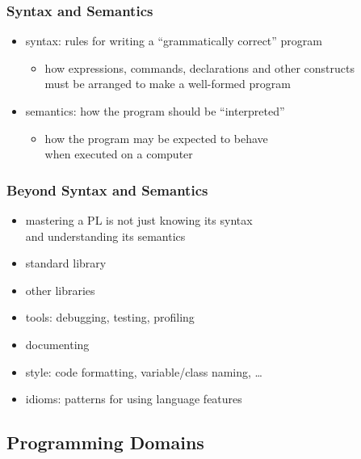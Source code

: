 \documentclass[dvipsnames]{beamer}
\theoremstyle{plain}
\begin{document}
\begin{frame}
  \frametitle{Syntax and Semantics}

  \begin{itemize}
    \item \alert{syntax}: rules for writing a ``grammatically correct'' program
    \begin{itemize}
      \item how expressions, commands, declarations and other constructs\\
        must be arranged to make a well-formed program
    \end{itemize}

    \pause
    \bigskip
    \item \alert{semantics}: how the program should be ``interpreted''
    \begin{itemize}
      \item how the program may be expected to behave\\
        when executed on a computer
    \end{itemize}
  \end{itemize}
\end{frame}

\begin{frame}
  \frametitle{Beyond Syntax and Semantics}

  \begin{itemize}
    \item mastering a PL is not just knowing its syntax\\
      and understanding its semantics

    \bigskip
    \item standard library
    \item other libraries
    \item tools: debugging, testing, profiling
    \item documenting
    \item style: code formatting, variable/class naming, \ldots

    \pause
    \bigskip
    \item \alert{idioms}: patterns for using language features
  \end{itemize}
\end{frame}

\subsection{Programming Domains}
\end{document}
